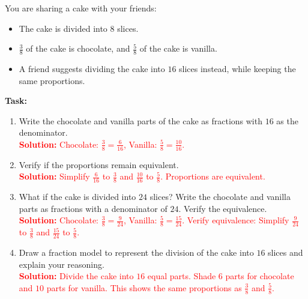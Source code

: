 \documentclass[12pt]{article}
\begin{document}
\vspace{1em}

\begin{tcolorbox}[colframe=black!60, colback=white, 
coltitle=black, colbacktitle=black!15, fonttitle=\bfseries\Large, 
title=Performance Task: Sharing a Cake, halign title=center, left=10pt, right=10pt, top=10pt, bottom=50pt]
You are sharing a cake with your friends:
\begin{itemize}
    \item The cake is divided into \( 8 \) slices.
    \item \( \frac{3}{8} \) of the cake is chocolate, and \( \frac{5}{8} \) of the cake is vanilla.
    \item A friend suggests dividing the cake into \( 16 \) slices instead, while keeping the same proportions.
\end{itemize}
\textbf{Task:}
\begin{enumerate}[itemsep=3em]
    \item Write the chocolate and vanilla parts of the cake as fractions with \( 16 \) as the denominator.\\
    \textcolor{red}{\textbf{Solution:} Chocolate: \( \frac{3}{8} = \frac{6}{16}\), Vanilla: \( \frac{5}{8} = \frac{10}{16}\).}

    \item Verify if the proportions remain equivalent.\\
    \textcolor{red}{\textbf{Solution:} Simplify \( \frac{6}{16} \) to \( \frac{3}{8} \) and \( \frac{10}{16} \) to \( \frac{5}{8}\). Proportions are equivalent.}

    \item What if the cake is divided into \( 24 \) slices? Write the chocolate and vanilla parts as fractions with a denominator of \( 24 \). Verify the equivalence.\\
    \textcolor{red}{\textbf{Solution:} Chocolate: \( \frac{3}{8} = \frac{9}{24}\), Vanilla: \( \frac{5}{8} = \frac{15}{24}\). Verify equivalence: Simplify \( \frac{9}{24} \) to \( \frac{3}{8} \) and \( \frac{15}{24} \) to \( \frac{5}{8}\).}

    \item Draw a fraction model to represent the division of the cake into \( 16 \) slices and explain your reasoning.\\
    \textcolor{red}{\textbf{Solution:} Divide the cake into \( 16 \) equal parts. Shade \( 6 \) parts for chocolate and \( 10 \) parts for vanilla. This shows the same proportions as \( \frac{3}{8} \) and \( \frac{5}{8}\).}
\end{enumerate}
\end{tcolorbox}
\end{document}
